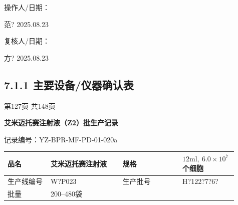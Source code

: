 \documentclass[UTF8,10pt,a4paper,fontset=fandol]{ctexart}
\newcommand{\fieldvalue}[1]{#1}
\newcommand{\handwritten}[1]{#1}
\begin{document}
\noindent
操作人/日期：

\fieldvalue{\handwritten{范?}}
\quad
\fieldvalue{\handwritten{2025.08.23}}

\hfill
复核人/日期：

\fieldvalue{\handwritten{方?}}
\quad
\fieldvalue{\handwritten{2025.08.23}}

\subsection*{7.1.1 主要设备/仪器确认表}

\begin{center}
第127页 共148页
\end{center}

\newpage

\begin{center}
\textbf{艾米迈托赛注射液（Z2）批生产记录}
\end{center}

\noindent
记录编号：YZ-BPR-MF-PD-01-020a

\begin{tabular}{|p{0.18\linewidth}|p{0.30\linewidth}|p{0.25\linewidth}|p{0.18\linewidth}|}
\hline
品名 & 艾米迈托赛注射液 & 规格 & $12\mathrm{ml},\ 6.0\times10^{7}$个细胞 \\
\hline
生产线编号 &
\fieldvalue{\handwritten{W?P023}} &
生产批号 &
\fieldvalue{\handwritten{H?122?7?6?}} \\
\hline
批量 & 200--480袋 & & \\
\hline
\end{tabular}

\vspace{0.4em}
\end{document}

